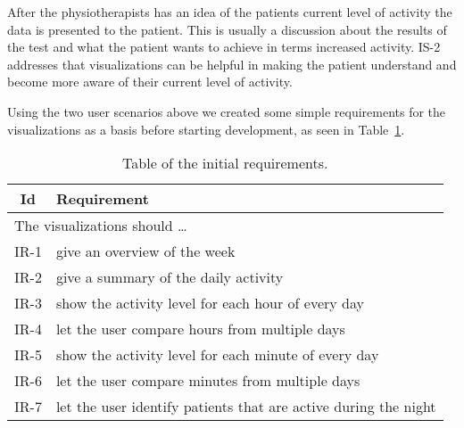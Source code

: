 After the physiotherapists has an idea of the patients current level of activity the data is presented to the patient. This is usually a discussion about the results of the test and what the patient wants to achieve in terms increased activity. IS-2 addresses that visualizations can be helpful in making the patient understand and become more aware of their current level of activity.

Using the two user scenarios above we created some simple requirements for the visualizations as a basis before starting development, as seen in Table~\ref{tab:initialRequirements1}.

\begin{table}[h!]
  \begin{center}
  \begin{tabular}{|c|p{12cm}|}
    \hline
      \textbf{Id} & \textbf{Requirement} \\ \hline
    \multicolumn{2}{|l|}{The visualizations should \ldots} \\ \hline
      IR-1 & give an overview of the week \\ \hline
      IR-2 & give a summary of the daily activity \\ \hline
      IR-3 & show the activity level for each hour of every day \\ \hline
      IR-4 & let the user compare hours from multiple days \\ \hline
      IR-5 & show the activity level for each minute of every day \\ \hline
      IR-6 & let the user compare minutes from multiple days \\ \hline
      IR-7 & let the user identify patients that are active during the night \\ \hline
  \end{tabular}
  \end{center}
  \caption{Table of the initial requirements.}
  \label{tab:initialRequirements1}
\end{table}
